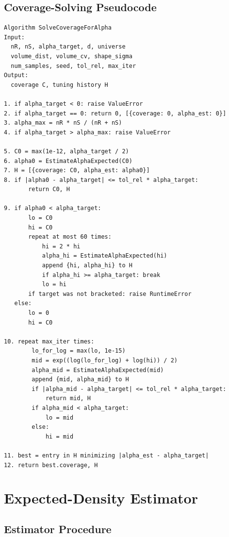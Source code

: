 \documentclass[11pt,a4paper]{article}
\begin{document}
\subsection{Coverage-Solving Pseudocode}

\begin{verbatim}
Algorithm SolveCoverageForAlpha
Input:
  nR, nS, alpha_target, d, universe
  volume_dist, volume_cv, shape_sigma
  num_samples, seed, tol_rel, max_iter
Output:
  coverage C, tuning history H

1. if alpha_target < 0: raise ValueError
2. if alpha_target == 0: return 0, [{coverage: 0, alpha_est: 0}]
3. alpha_max = nR * nS / (nR + nS)
4. if alpha_target > alpha_max: raise ValueError

5. C0 = max(1e-12, alpha_target / 2)
6. alpha0 = EstimateAlphaExpected(C0)
7. H = [{coverage: C0, alpha_est: alpha0}]
8. if |alpha0 - alpha_target| <= tol_rel * alpha_target:
       return C0, H

9. if alpha0 < alpha_target:
       lo = C0
       hi = C0
       repeat at most 60 times:
           hi = 2 * hi
           alpha_hi = EstimateAlphaExpected(hi)
           append {hi, alpha_hi} to H
           if alpha_hi >= alpha_target: break
           lo = hi
       if target was not bracketed: raise RuntimeError
   else:
       lo = 0
       hi = C0

10. repeat max_iter times:
        lo_for_log = max(lo, 1e-15)
        mid = exp((log(lo_for_log) + log(hi)) / 2)
        alpha_mid = EstimateAlphaExpected(mid)
        append {mid, alpha_mid} to H
        if |alpha_mid - alpha_target| <= tol_rel * alpha_target:
            return mid, H
        if alpha_mid < alpha_target:
            lo = mid
        else:
            hi = mid

11. best = entry in H minimizing |alpha_est - alpha_target|
12. return best.coverage, H
\end{verbatim}

\section{Expected-Density Estimator}

\subsection{Estimator Procedure}
\end{document}

